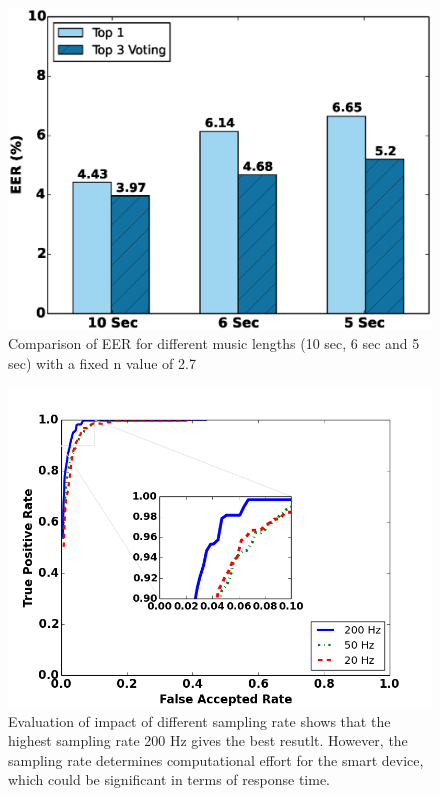 \begin{figure}[t]
\centering
\includegraphics [width=\columnwidth]{figure/exp2_vary_length.eps}
\caption{Comparison of EER for different music lengths (10 sec, 6 sec and 5
sec) with a fixed n value of 2.7}
\label{fig:eer-length}
\end{figure}



\begin{figure}
\includegraphics[width=\columnwidth]{figure/roc_dtw_diff_freq.png}
\caption{\label{fig:roc_dtw_diff_freq} Evaluation of impact of different sampling rate shows that the highest sampling rate 200 Hz gives the best resutlt. However, the sampling rate determines computational effort for the smart device, which could be significant in terms of response time.}
\end{figure}


